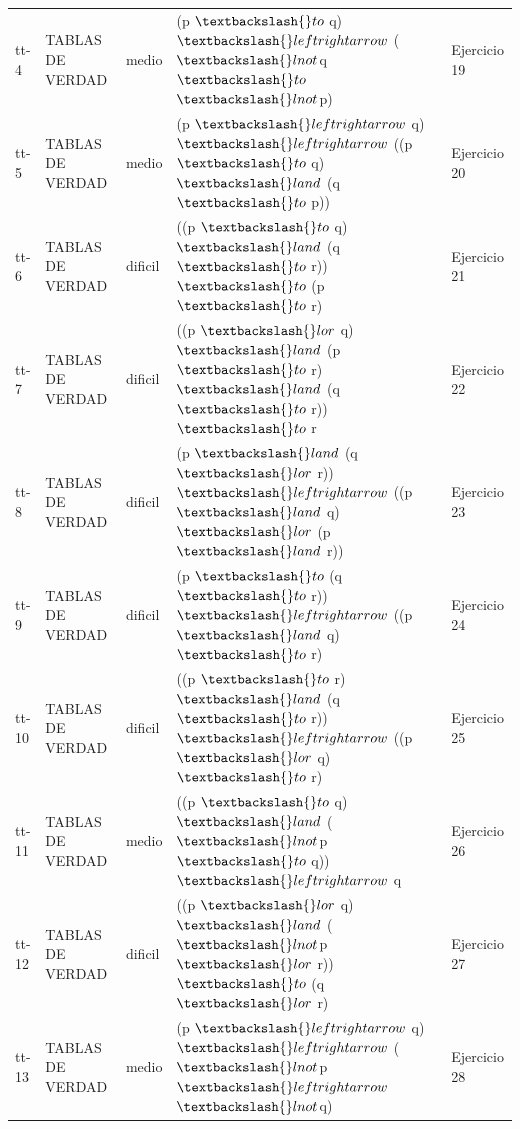 \documentclass[11pt,a4paper,openany]{book}
\begin{document}
\begin{center}
\begin{longtable}{lllll}
tt-4 & TABLAS DE VERDAD & medio & (p $ \textbackslash\{\}to $ q) $ \textbackslash\{\}leftrightarrow $ ($ \textbackslash\{\}lnot $q $ \textbackslash\{\}to $ $ \textbackslash\{\}lnot $p) & Ejercicio 19 \\
tt-5 & TABLAS DE VERDAD & medio & (p $ \textbackslash\{\}leftrightarrow $ q) $ \textbackslash\{\}leftrightarrow $ ((p $ \textbackslash\{\}to $ q) $ \textbackslash\{\}land $ (q $ \textbackslash\{\}to $ p)) & Ejercicio 20 \\
tt-6 & TABLAS DE VERDAD & dificil & ((p $ \textbackslash\{\}to $ q) $ \textbackslash\{\}land $ (q $ \textbackslash\{\}to $ r)) $ \textbackslash\{\}to $ (p $ \textbackslash\{\}to $ r) & Ejercicio 21 \\
tt-7 & TABLAS DE VERDAD & dificil & ((p $ \textbackslash\{\}lor $ q) $ \textbackslash\{\}land $ (p $ \textbackslash\{\}to $ r) $ \textbackslash\{\}land $ (q $ \textbackslash\{\}to $ r)) $ \textbackslash\{\}to $ r & Ejercicio 22 \\
tt-8 & TABLAS DE VERDAD & dificil & (p $ \textbackslash\{\}land $ (q $ \textbackslash\{\}lor $ r)) $ \textbackslash\{\}leftrightarrow $ ((p $ \textbackslash\{\}land $ q) $ \textbackslash\{\}lor $ (p $ \textbackslash\{\}land $ r)) & Ejercicio 23 \\
tt-9 & TABLAS DE VERDAD & dificil & (p $ \textbackslash\{\}to $ (q $ \textbackslash\{\}to $ r)) $ \textbackslash\{\}leftrightarrow $ ((p $ \textbackslash\{\}land $ q) $ \textbackslash\{\}to $ r) & Ejercicio 24 \\
tt-10 & TABLAS DE VERDAD & dificil & ((p $ \textbackslash\{\}to $ r) $ \textbackslash\{\}land $ (q $ \textbackslash\{\}to $ r)) $ \textbackslash\{\}leftrightarrow $ ((p $ \textbackslash\{\}lor $ q) $ \textbackslash\{\}to $ r) & Ejercicio 25 \\
tt-11 & TABLAS DE VERDAD & medio & ((p $ \textbackslash\{\}to $ q) $ \textbackslash\{\}land $ ($ \textbackslash\{\}lnot $p $ \textbackslash\{\}to $ q)) $ \textbackslash\{\}leftrightarrow $ q & Ejercicio 26 \\
tt-12 & TABLAS DE VERDAD & dificil & ((p $ \textbackslash\{\}lor $ q) $ \textbackslash\{\}land $ ($ \textbackslash\{\}lnot $p $ \textbackslash\{\}lor $ r)) $ \textbackslash\{\}to $ (q $ \textbackslash\{\}lor $ r) & Ejercicio 27 \\
tt-13 & TABLAS DE VERDAD & medio & (p $ \textbackslash\{\}leftrightarrow $ q) $ \textbackslash\{\}leftrightarrow $ ($ \textbackslash\{\}lnot $p $ \textbackslash\{\}leftrightarrow $ $ \textbackslash\{\}lnot $q) & Ejercicio 28 \\

\end{longtable}
\end{center}
\end{document}
